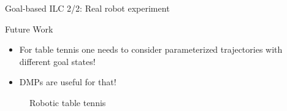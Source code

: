\documentclass[handout]{beamer}
\begin{document}
\begin{frame}{Goal-based ILC 2/2: Real robot experiment}
\begin{figure}[ht]
\centering
{}
\label{Robot experiment} 
\end{figure}
\end{frame}
%
\begin{frame}{Future Work}
\begin{itemize}
\item For table tennis one needs to consider parameterized trajectories with different goal states!
\item DMPs are useful for that!
\end{itemize}
\begin{figure}[b!]
\centering
{}
\label{Robot table tennis}
\caption{Robotic table tennis}
\end{figure}
\end{frame}
\end{document}
